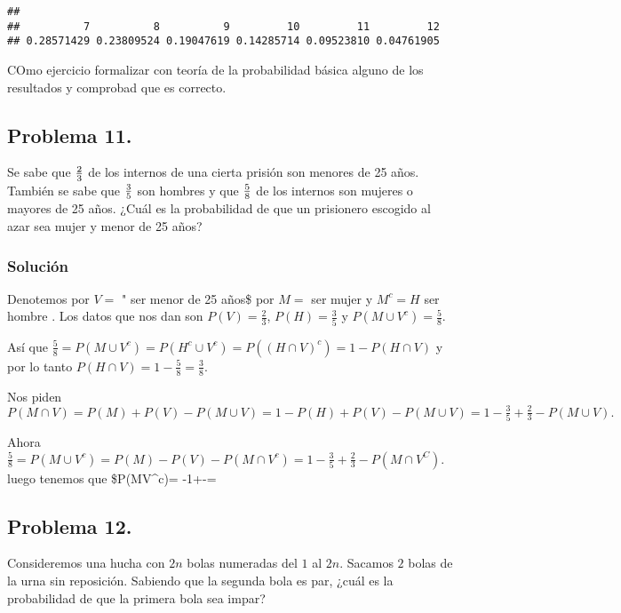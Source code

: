 \documentclass[
]{article}
\begin{document}
\begin{verbatim}
## 
##          7          8          9         10         11         12 
## 0.28571429 0.23809524 0.19047619 0.14285714 0.09523810 0.04761905
\end{verbatim}

COmo ejercicio formalizar con teoría de la probabilidad básica alguno de
los resultados y comprobad que es correcto.

\hypertarget{problema-11.}{%
\subsection{Problema 11.}\label{problema-11.}}

Se sabe que \({2 \over 3}\) de los internos de una cierta prisión son
menores de 25 años. También se sabe que \({3\over 5}\) son hombres y que
\({5\over 8}\) de los internos son mujeres o mayores de 25 años. ¿Cuál
es la probabilidad de que un prisionero escogido al azar sea mujer y
menor de 25 años?

\hypertarget{soluciuxf3n-11}{%
\subsubsection{Solución}\label{soluciuxf3n-11}}

Denotemos por \(V=\) " ser menor de 25 años\$ por \(M=\) ser mujer y
\(M^c=H\) ser hombre . Los datos que nos dan son \(P(V)=\frac{2}{3}\),
\(P(H)= \frac{3}{5}\) y \(P(M\cup V^c )=\frac{5}{8}.\)

Así que
\(\frac{5}{8}=P(M\cup V^c)=P(H^c\cup V^c)=P((H\cap V)^c)=1-P(H\cap V)\)
y por lo tanto \(P(H\cap V)=1- \frac{5}{8}=\frac{3}{8}.\)

Nos piden
\(P(M\cap V)=P(M)+P(V)-P(M\cup V)=1-P(H)+P(V)-P(M\cup V)=1-\frac{3}{5}+\frac{2}{3}-P(M\cup V).\)

Ahora
\(\frac{5}{8}=P(M\cup V^c)=P(M)-P(V)-P(M\cap V^c)=1-\frac{3}{5}+\frac{2}{3}-P(M\cap V^C).\)
luego tenemos que \$P(M\cap V\^{}c)=
-1+-=

\hypertarget{problema-12.}{%
\subsection{Problema 12.}\label{problema-12.}}

Consideremos una hucha con \(2n\) bolas numeradas del \(1\) al \(2n\).
Sacamos \(2\) bolas de la urna sin reposición. Sabiendo que la segunda
bola es par, ¿cuál es la probabilidad de que la primera bola sea impar?
\end{document}

